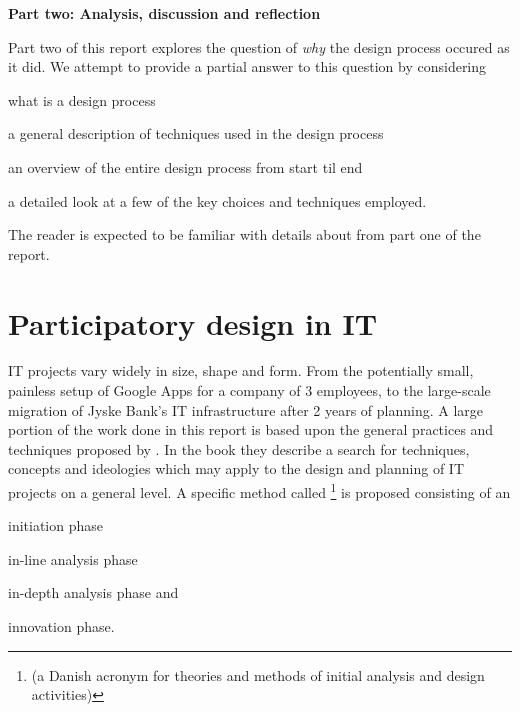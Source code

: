 \setcounter{section}{0}
\setcounter{figure}{0}
\setcounter{table}{0}
\newpage
\textbf{\LARGE{{Part two: Analysis, discussion and reflection}}}\\


Part two of this report explores the question of \textit{why}
the design process occured as it did. We attempt to provide a
partial answer to this question by considering
\begin{inparaenum}[1)]
\item what is a design process
\item a general description of techniques used in the design process
\item an overview of the entire design process from start til end
\item a detailed look at a few of the key choices and techniques employed.
\end{inparaenum}

The reader is expected to be familiar with details about \gomonkey{} 
from part one of the report.

\section{Participatory design in IT}

IT projects vary widely in size, shape and form. From the potentially small, painless 
setup of Google Apps for a company of 3 employees, to the large-scale migration of
Jyske Bank's IT infrastructure after 2 years of planning\cite{jyskebank}.
A large portion of the work done in this report is based upon the general
practices and techniques proposed by \cite{bodker2004participatory}. In the book
they describe a search for techniques, concepts and ideologies which may apply
to the design and planning of IT projects on a general level. A specific method called 
\must{}\footnote{(a Danish acronym for theories and methods of initial analysis and 
design activities)} is proposed consisting of an
\begin{inparaenum}[1)]
\item initiation phase
\item in-line analysis phase
\item in-depth analysis phase and
\item innovation phase.
\end{inparaenum}

